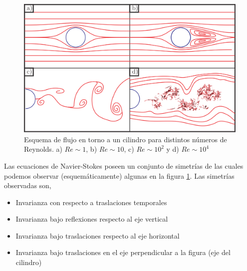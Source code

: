 \documentclass[executivepaper,12pt]{article}
\numberwithin{equation}{section}
\begin{document}
\begin{figure}[H]
	\begin{center}
		\includegraphics[scale=1]{simetrias}
	\end{center}
	\caption{Esquema de flujo en torno a un cilindro para distintos números de Reynolds. a) $Re\sim 1$, b) $Re \sim 10$, c) $Re\sim 10^2$ y d) $Re\sim 
		10^4$   }
	\label{fig-sim}
\end{figure}

Las ecuaciones de Navier-Stokes poseen un conjunto de simetrías de las cuales podemos observar (esquemáticamente) algunas en la figura \ref{fig-sim}. Las simetrías observadas son,
\begin{itemize}
	\item Invarianza con respecto a traslaciones temporales  
	\item Invarianza bajo reflexiones respecto al eje vertical
	\item Invarianza bajo traslaciones respecto al eje horizontal
	\item Invarianza bajo traslaciones en el eje perpendicular a la figura (eje del cilindro)
\end{itemize}
\end{document}
